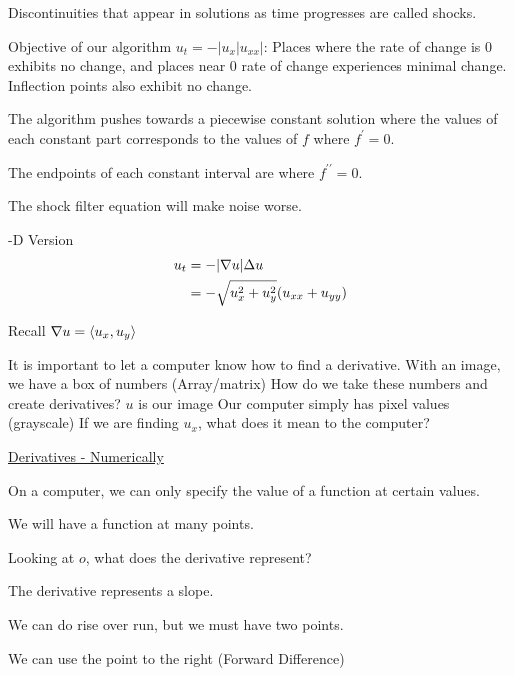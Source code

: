 \documentclass{article}
\begin{document}
\dfn Discontinuities that appear in solutions as time progresses are called shocks.

Objective of our algorithm $u_t = -|u_x| u_{xx}|$: Places where the rate of change is $0$ exhibits no change, and places near $0$ rate of change experiences minimal change. Inflection points also exhibit no change.

The algorithm pushes towards a piecewise constant solution where the values of each constant part corresponds to the values of $f$ where $f^\prime = 0$.

The endpoints of each constant interval are where $f^{\prime\prime} = 0$.

\note The shock filter equation will make noise worse.

-D Version
%
\begin{align}
  u_t & = - | \nabla u | \Delta u\\
  & = - \sqrt{u^2_x + u^2_y} (u_{xx} + u_{yy})
\end{align}

Recall $\nabla u = \left< u_x, u_y \right>$



It is important to let a computer know how to find a derivative.
With an image, we have a box of numbers (Array/matrix)
How do we take these numbers and create derivatives?
$u$ is our image
Our computer simply has pixel values (grayscale)
If we are finding $u_x$, what does it mean to the computer?

\underline{Derivatives - Numerically}

On a computer, we can only specify the value of a function at certain values.


We will have a function at many points.

Looking at $o$, what does the derivative represent?

The derivative represents a slope.

We can do rise over run, but we must have two points.

We can use the point to the right (Forward Difference)
\end{document}
